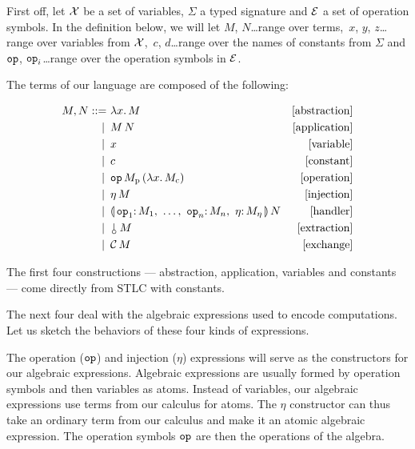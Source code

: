 \documentclass{llncs}
\begin{document}
First off, let $\mathcal{X}$ be a set of variables, $\Sigma$ a typed signature and
$\mathcal{E}$ a set of operation symbols. In the definition below, we will let $M$,
$N$\ldots range over terms,\, $x$, $y$, $z$\ldots range over variables from
$\mathcal{X}$,\, $c$, $d$\ldots range over the names of constants from $\Sigma$ and
$\mathtt{op}$, $\mathtt{op}_i$\ldots range over the operation symbols in $\mathcal{E}$.

The terms of our language are composed of the following:

\begin{align*}
  M, N ::= &\ \lam{x}{M} & \mbox{[abstraction]} \\
   | \, &\ \ap{M}{N} & \mbox{[application]} \\
   | \, &\ x & \mbox{[variable]} \\
   | \, &\ c & \mbox{[constant]} \\
   | \, &\ \app{\op{op}}{M_{\mathrm{p}}}{(\lam{x}{M_{\mathrm{c}}})} & \mbox{[operation]} \\
   | \, &\ \ap{\eta}{M} & \mbox{[injection]} \\
   | \, &\ \ap{\cdbanana}{N} & \mbox{[handler]} \\
   | \, &\ \ap{\cherry}{M} & \mbox{[extraction]} \\
   | \, &\ \ap{\CC}{M} & \mbox{[exchange]} 
\end{align*}

The first four constructions --- abstraction, application, variables and
constants --- come directly from STLC with constants.

The next four deal with the algebraic expressions used to encode
computations. Let us sketch the behaviors of these four kinds of
expressions.

The operation ($\mathtt{op}$) and injection ($\eta$) expressions will serve as
the constructors for our algebraic expressions. Algebraic expressions are
usually formed by operation symbols and then variables as atoms. Instead of
variables, our algebraic expressions use terms from our calculus for
atoms. The $\eta$ constructor can thus take an ordinary term from our
calculus and make it an atomic algebraic expression. The operation symbols
$\mathtt{op}$ are then the operations of the algebra.
\end{document}
